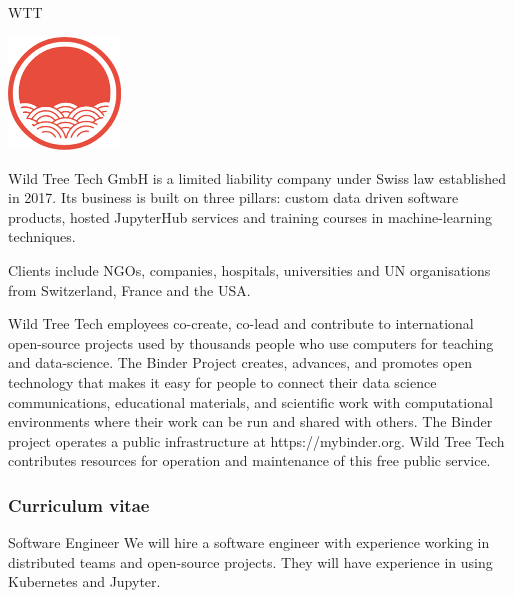 \begin{sitedescription}{WTT}
\label{sitedescription:wildtree}

\begin{center}
\includegraphics[height=3cm]{Participants/Logos/WildTree.png}
\end{center}

Wild Tree Tech GmbH is a limited liability company under Swiss law established
in 2017. Its business is built on three pillars: custom data driven software products,
hosted JupyterHub services and training courses in machine-learning techniques.

Clients include NGOs, companies, hospitals, universities and UN organisations
from Switzerland, France and the USA.

Wild Tree Tech employees co-create, co-lead and contribute to international
open-source projects used by thousands people who use computers for teaching
and data-science. The Binder Project creates, advances, and promotes
open technology that makes it easy for people to connect their data
science communications, educational materials, and scientific work with
computational environments where their work can be run and shared with others.
The Binder project operates a public infrastructure at https://mybinder.org.
Wild Tree Tech contributes resources for operation and maintenance of this
free public service.



\subsubsection*{Curriculum vitae}




\begin{participant}[type=R,PM=24,salary=9580]{Software Engineer} %
  We will hire a software engineer with experience working in distributed teams
  and open-source projects. They will have experience in using Kubernetes and
  Jupyter.
\end{participant}


\end{sitedescription}
